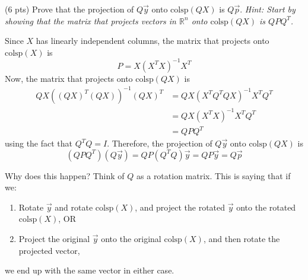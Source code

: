 \documentclass[11pt]{article}
\begin{document}
\begin{prob}
\begin{subprob}(6 pts)
Prove that the projection of $Q \vec y$ onto $\text{colsp}(QX)$ is $Q \vec p$. \textit{Hint: Start by showing that the matrix that projects vectors in $\mathbb{R}^n$ onto $\text{colsp}(QX)$ is $Q P Q^T$.} \\

\emptybox{13.5cm}
\begin{solution}
Since $X$ has linearly independent columns, the matrix that projects onto $\text{colsp}(X)$ is
\[
P=X(X^TX)^{-1}X^T
\]
Now, the matrix that projects onto $\text{colsp}(QX)$ is
\begin{align*}
QX((QX)^T(QX))^{-1}(QX)^T
&=
QX(X^TQ^TQX)^{-1}X^TQ^T \\
&=
QX(X^TX)^{-1}X^TQ^T \\
&=
QPQ^T
\end{align*}
using the fact that $Q^TQ=I$. Therefore, the projection of $Q\vec{y}$ onto $\text{colsp}(QX)$ is
\[
(QPQ^T)(Q\vec{y})
=
QP(Q^TQ)\vec{y}
=
QP\vec{y}
=
Q\vec{p}
\]

Why does this happen? Think of $Q$ as a rotation matrix. This is saying that if we:
\begin{enumerate}
    \item Rotate $\vec y$ and rotate $\text{colsp}(X)$, and project the rotated $\vec y$ onto the rotated $\text{colsp}(X)$, OR
    \item Project the original $\vec y$ onto the original $\text{colsp}(X)$, and then rotate the projected vector,
\end{enumerate}

we end up with the same vector in either case.
\end{solution}
\end{subprob}

\end{prob}

\newpage
\end{document}
